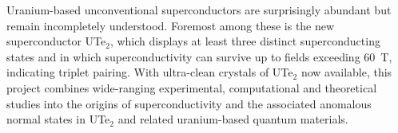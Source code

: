 \onecolumngrid

\begin{mdframed}[hidealllines=true,backgroundcolor=blue!5,innerleftmargin=5pt,innerrightmargin=5pt,innertopmargin=5pt,innerbottommargin=5pt]
\noindent
Uranium-based unconventional superconductors are surprisingly abundant but remain incompletely understood. Foremost among these is the new superconductor UTe$_2$,  which displays at least three distinct superconducting states and in which superconductivity can survive up to fields exceeding \SI{60}{\tesla}, indicating triplet pairing. With ultra-clean crystals of UTe$_2$ now available, this project combines wide-ranging experimental, computational and theoretical studies into the origins of superconductivity and the associated anomalous normal states in UTe$_2$ and related uranium-based quantum materials. %
\end{mdframed}
  
